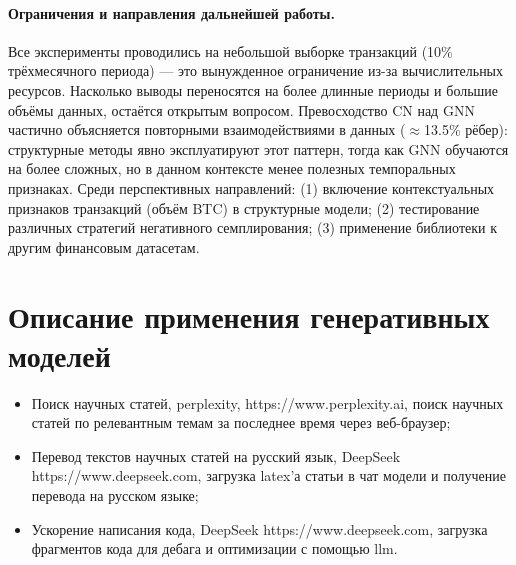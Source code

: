 \documentclass[a4paper,12pt]{extarticle}
\begin{document}
\paragraph{Ограничения и направления дальнейшей работы.}
Все эксперименты проводились на небольшой выборке транзакций (10\% трёхмесячного периода) --- это вынужденное ограничение из-за вычислительных ресурсов. Насколько выводы переносятся на более длинные периоды и большие объёмы данных, остаётся открытым вопросом. Превосходство CN над GNN частично объясняется повторными взаимодействиями в данных ($\approx$13.5\% рёбер): структурные методы явно эксплуатируют этот паттерн, тогда как GNN обучаются на более сложных, но в данном контексте менее полезных темпоральных признаках. Среди перспективных направлений: 
(1) включение контекстуальных признаков транзакций (объём BTC) в структурные модели; 
(2) тестирование различных стратегий негативного семплирования; 
(3) применение библиотеки к другим финансовым датасетам.
\newpage
\printbibliography[heading=bibintoc] 

	
\newpage
\appendix

\section{Описание применения генеративных моделей}

\begin{itemize}
    \item Поиск научных статей, perplexity, https://www.perplexity.ai, поиск научных статей по релевантным темам за последнее время через веб-браузер;
    \item Перевод текстов научных статей на русский язык, DeepSeek https://www.deepseek.com, загрузка latex’а статьи в чат модели и получение перевода на русском языке;
    \item Ускорение написания кода, DeepSeek https://www.deepseek.com, загрузка фрагментов кода для дебага и оптимизации с помощью llm.
\end{itemize}
\end{document}
